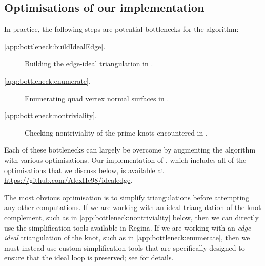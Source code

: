 \documentclass[10pt,a4paper]{amsart}
\begin{document}
\subsection{Optimisations of our implementation}\label{ssec:bottlenecks}

In practice, the following steps are potential bottlenecks for the algorithm:
\begin{description}
\item[\ref{app:bottleneck:buildIdealEdge}.]
Building the edge-ideal triangulation in .
\item[\ref{app:bottleneck:enumerate}.]
Enumerating quad vertex normal surfaces in .
\item[\ref{app:bottleneck:nontriviality}.]
Checking nontriviality of the prime knots encountered in .
\end{description}
Each of these bottlenecks can largely be overcome by augmenting the algorithm with various optimisations.
Our implementation of , which includes all of the optimisations that we discuss below, is available at \url{https://github.com/AlexHe98/idealedge}.

The most obvious optimisation is to simplify triangulations before attempting any other computations. If we are working with an ideal triangulation of the knot complement, such as in \ref{app:bottleneck:nontriviality} below,
then we can directly use the simplification tools available in Regina. If we are working with an \emph{edge-ideal} triangulation of the knot, such as in \ref{app:bottleneck:enumerate},
then we must instead use custom simplification tools that are specifically designed to ensure that the ideal loop is preserved;
see  for details.
\end{document}
